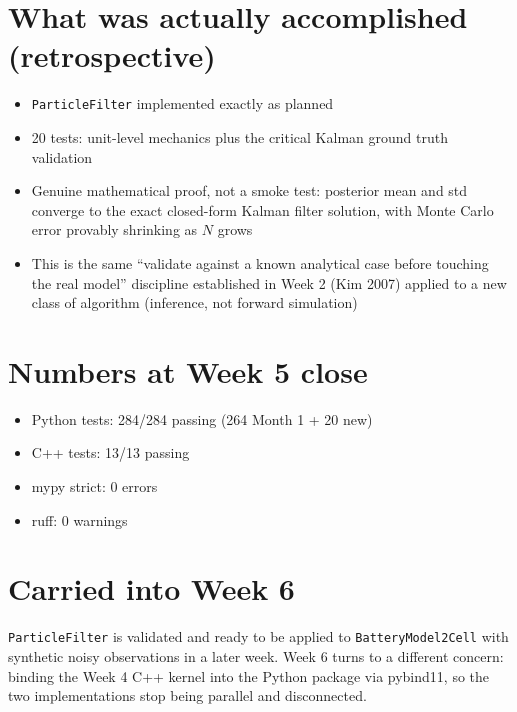 \documentclass[11pt]{article}
\begin{document}
\section*{What was actually accomplished (retrospective)}

\begin{itemize}[leftmargin=*]
  \item \texttt{ParticleFilter} implemented exactly as planned
  \item 20 tests: unit-level mechanics plus the critical Kalman ground
    truth validation
  \item Genuine mathematical proof, not a smoke test: posterior mean
    and std converge to the exact closed-form Kalman filter solution,
    with Monte Carlo error provably shrinking as $N$ grows
  \item This is the same ``validate against a known analytical case
    before touching the real model'' discipline established in Week 2
    (Kim 2007) applied to a new class of algorithm (inference, not
    forward simulation)
\end{itemize}

\section*{Numbers at Week 5 close}
\begin{itemize}[leftmargin=*]
  \item Python tests: 284/284 passing (264 Month 1 + 20 new)
  \item C++ tests: 13/13 passing
  \item mypy strict: 0 errors
  \item ruff: 0 warnings
\end{itemize}

\section*{Carried into Week 6}
\texttt{ParticleFilter} is validated and ready to be applied to
\texttt{BatteryModel2Cell} with synthetic noisy observations in a
later week. Week 6 turns to a different concern: binding the Week 4
C++ kernel into the Python package via pybind11, so the two
implementations stop being parallel and disconnected.
\end{document}
